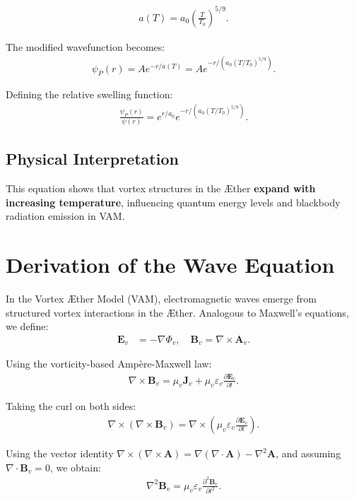\documentclass[a4paper,12pt]{article}
\begin{document}
\begin{align}
    a(T) = a_0 \left(\frac{T}{T_0}\right)^{5/9}.
\end{align}

The modified wavefunction becomes:
\begin{align}
    \psi_P(r) = A e^{-r/a(T)} = A e^{-r/(a_0 (T/T_0)^{5/9})}.
\end{align}

Defining the relative swelling function:
\begin{align}
    \frac{\psi_P(r)}{\psi(r)} = e^{r/a_0} e^{-r/(a_0 (T/T_0)^{5/9})}.
\end{align}

\subsection{Physical Interpretation}
This equation shows that vortex structures in the Æther \textbf{expand with increasing temperature}, influencing quantum energy levels and blackbody radiation emission in VAM.
\label{appendix:9}

\section{Derivation of the Wave Equation}

In the Vortex Æther Model (VAM), electromagnetic waves emerge from structured vortex interactions in the Æther. Analogous to Maxwell's equations, we define:
\begin{align}
    \mathbf{E}_v &= -\nabla \Phi_v, \quad \mathbf{B}_v = \nabla \times \mathbf{A}_v.
\end{align}

Using the vorticity-based Ampère-Maxwell law:
\begin{align}
    \nabla \times \mathbf{B}_v = \mu_v \mathbf{J}_v + \mu_v \varepsilon_v \frac{\partial \mathbf{E}_v}{\partial t}.
\end{align}

Taking the curl on both sides:
\begin{align}
    \nabla \times (\nabla \times \mathbf{B}_v) = \nabla \times \left(\mu_v \varepsilon_v \frac{\partial \mathbf{E}_v}{\partial t} \right).
\end{align}

Using the vector identity \( \nabla \times (\nabla \times \mathbf{A}) = \nabla (\nabla \cdot \mathbf{A}) - \nabla^2 \mathbf{A} \), and assuming \(\nabla \cdot \mathbf{B}_v = 0\), we obtain:
\begin{align}
    \nabla^2 \mathbf{B}_v = \mu_v \varepsilon_v \frac{\partial^2 \mathbf{B}_v}{\partial t^2}.
\end{align}
\end{document}
